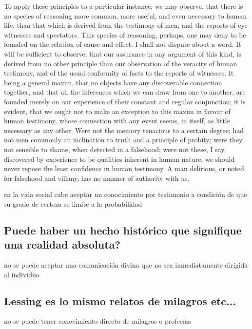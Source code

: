 To apply these principles to a particular instance, we may observe, that there
is no species of reasoning more common, more useful, and even necessary to human
life, than that which is derived from the testimony of men, and the reports of
eye witnesses and spectators. This species of reasoning, perhaps, one may deny
to be founded on the relation of cause and effect. I shall not dispute about a
word. It will be sufficient to observe, that our assurance in any argument of
this kind, is derived from no other principle than our observation of the
veracity of human testimony, and of the usual conformity of facts to the reports
of witnesses. It being a general maxim, that no objects have any discoverable
connection together, and that all the inferences which we can draw from one to
another, are founded merely on our experience of their constant and regular
conjunction; it is evident, that we ought not to make an exception to this maxim
in favour of human testimony, whose connection with any event seems, in itself,
as little necessary as any other. Were not the memory tenacious to a certain
degree; had not men commonly an inclination to truth and a principle of probity;
were they not sensible to shame, when detected in a falsehood; were not these, I
say, discovered by experience to be qualities inherent in human nature, we
should never repose the least confidence in human testimony. A man delirious, or
noted for falsehood and villany, has no manner of authority with us.


en la vida social cabe aceptar un conocimiento por testimonio a condición de que
su grado de certeza se limite a la probabilidad

\subsection{Puede haber un hecho histórico que signifique una realidad absoluta?}
no se puede aceptar una comunicación divina que no sea inmediatamente dirigida
al individuo

\subsection{Lessing es lo mismo relatos de milagros etc...}
no se puede tener conocimiento directo de milagros
o profecías

